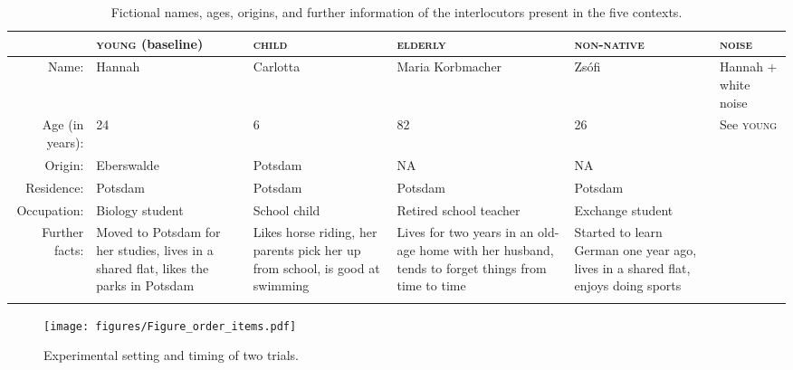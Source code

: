 \documentclass[output=paper]{langscibook}
\begin{document}
\begin{table}[p]
\footnotesize
    \begin{tabularx}{\textwidth}{rQQQQQ}
      \lsptoprule
         & \textsc{young}  (baseline) & \textsc{child} & \textsc{elderly} & \textsc{non-native} & \textsc{noise} \\\midrule
       Name:  & Hannah & Carlotta & Maria  Korbmacher & Zsófi & Hannah +  white noise \\\addlinespace
       Age  (in years): & 24 & 6 & 82 & 26 & See \textsc{young} \\\addlinespace
       Origin: & Eberswalde & Potsdam & NA & NA & \\\addlinespace
       Residence: & Potsdam & Potsdam & Potsdam & Potsdam & \\\addlinespace
       Occupation: & Biology  student & School child & Retired school teacher & Exchange  student & \\\addlinespace
       Further facts: & Moved to  Potsdam for  her studies, lives in a  shared flat, likes the parks in Potsdam & Likes horse riding, her parents  pick her up  from school, is good at  swimming & Lives for two  years in an  old-age home with her  husband, tends to forget things from  time to time & Started to  learn German one year ago,  lives in a  shared flat, enjoys doing  sports & \\
    \lspbottomrule
    \end{tabularx}
    \caption{Fictional names, ages, origins, and further information of the interlocutors present in the five contexts.}
    \label{tab:contexts}
\end{table}

\begin{figure}[p]
\texttt{[image: figures/Figure\_order\_items.pdf]}
\caption{Experimental setting and timing of two trials.}
\label{fig:method_stimuli}
\end{figure}
\end{document}
